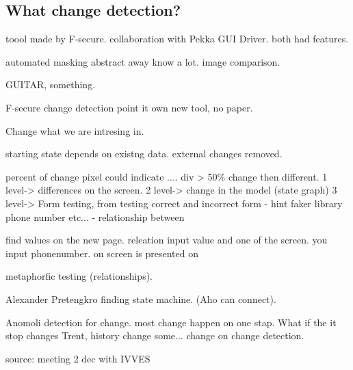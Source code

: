 \subsection{What change detection?}

toool made by F-secure. collaboration with Pekka GUI Driver. both had features. 

automated masking abstract away know a lot. image comparison. 

GUITAR, something. 

F-secure change detection point it own 
new tool, no paper. 

Change what we are intresing in.

starting state depends on existng data. external changes removed. 

percent of change pixel could indicate .... div > 50\% change then different. 
1 level-> differences on the screen.
2 level-> change in the model (state graph)
3 level-> Form testing, from testing correct and incorrect form
 - hint faker library phone number etc...
 - relationship between 

find values on the new page. releation input value and one of the screen. you input phonenumber. on screen is presented on

metaphorfic testing (relationships). 

Alexander Pretengkro finding state machine. (Aho can connect).

Anomoli detection for change. most change happen on one stap. What if the it stop changes Trent, history change some... change on change detection. 
 
 source: meeting 2 dec with IVVES 